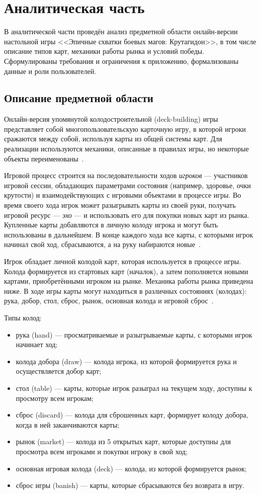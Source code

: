 \chapter{Аналитическая часть}

В аналитической части проведён анализ предметной области онлайн-версии настольной игры <<Эпичные схватки боевых магов: Крутагидон>>, в том числе описание типов карт, механики работы рынка и условий победы. Сформулированы требования и ограничения к приложению, формализованы данные и роли пользователей.


\section{Описание предметной области}

Онлайн-версия упомянутой колодостроительной (deck-building) игры представляет собой многопользовательскую карточную игру, в которой игроки сражаются между собой, используя карты из общей системы карт. Для реализации используются механики, описанные в правилах игры, но некоторые объекты переименованы~\cite{rules}.

Игровой процесс строится на последовательности ходов \textit{игроков} --- участников игровой сессии, обладающих параметрами состояния (например, здоровье, очки крутости) и взаимодействующих с игровыми объектами в процессе игры. Во время своего хода игрок может разыгрывать карты из своей руки, получать игровой ресурс --- \textit{эхо} --- и использовать его для покупки новых карт из рынка. Купленные карты добавляются в личную колоду игрока и могут быть использованы в дальнейшем. В конце каждого хода все карты, с которыми игрок начинал свой ход, сбрасываются, а на руку набираются новые~\cite{rules}.

Игрок обладает личной колодой карт, которая используется в процессе игры. Колода формируется из стартовых карт (началок), а затем пополняется новыми картами, приобретёнными игроком на рынке. Механика работы рынка приведена ниже. В ходе игры карты могут находиться в различных состояниях (колодах): рука, добор, стол, сброс, рынок, основная колода и игровой сброс~\cite{rules}.

Типы колод:
\begin{itemize}
	\item рука (hand) --- просматриваемые и разыгрываемые карты, с которыми игрок начинает ход;
	\item колода добора (draw) --- колода игрока, из которой формируется рука и осуществляется добор карт;
	\item стол (table) --- карты, которые игрок разыграл на текущем ходу, доступны к просмотру всем игрокам;
	\item сброс (discard) --- колода для сброшенных карт, формирует колоду добора, когда в ней заканчиваются карты;
	\item рынок (market) --- колода из 5 открытых карт, которые доступны для просмотра всем игроками и покупки игроку в свой ход;
	\item основная игровая колода (deck) --- колода, из которой формируется рынок;
	\item сброс игры (banish) --- карты, которые сбрасываются без возврата в игру.
\end{itemize}

